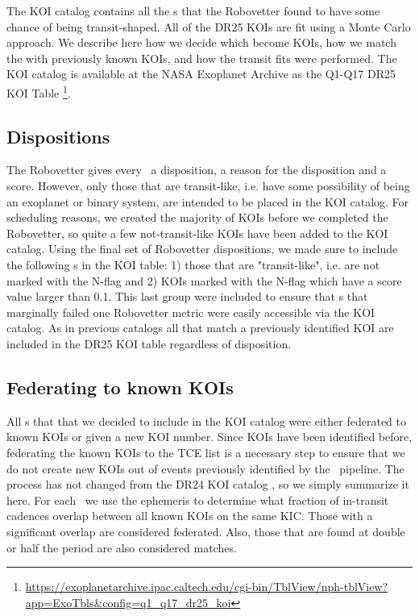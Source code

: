 The KOI catalog contains all the \opstce s that the Robovetter found to have some chance of being transit-shaped. All of the DR25 KOIs are fit using a Monte Carlo approach. We describe here how we decide which  become KOIs, how we match the  with previously known KOIs, and how the transit fits were performed. The KOI catalog is available at the NASA Exoplanet Archive as the Q1-Q17 DR25 KOI Table \footnote{\url{https://exoplanetarchive.ipac.caltech.edu/cgi-bin/TblView/nph-tblView?app=ExoTbls\&config=q1\_q17\_dr25\_koi}}.
\label{koisec}

\subsection{Dispositions}
The Robovetter gives every \opstce\ a disposition, a reason for the disposition and a score.  However, only those that are transit-like, i.e. have some possibility of being an exoplanet or binary system, are intended to be placed in the KOI catalog. For scheduling reasons, we created the majority of KOIs before we completed the Robovetter, so quite a few not-transit-like KOIs have been added to the KOI catalog. Using the final set of Robovetter dispositions, we made sure to include the following \opstce s in the KOI table: 1) those that are "transit-like", i.e. are not marked with the N-flag and 2) KOIs marked with the N-flag which have a score value larger than 0.1.  This last group were included to ensure that \opstce s that marginally failed one Robovetter metric were easily accessible via the KOI catalog. As in previous catalogs all  that match a previously identified KOI are included in the DR25 KOI table regardless of disposition.


\subsection{Federating to known KOIs}
\label{s:federation}
All \opstce s that that we decided to include in the KOI catalog were either federated to known KOIs or given a new KOI number. Since KOIs have been identified before, federating the known KOIs to the TCE list is a necessary step to ensure that we do not create new KOIs out of events previously identified by the \Kepler\ pipeline.  The process has not changed from the  DR24 KOI catalog \citep{Coughlin2016}, so we simply summarize it here.  For each \opstce\ we use the ephemeris to determine what fraction of in-transit cadences overlap between all known KOIs on the same KIC.  Those with a significant overlap are considered federated.  Also, those that are found at double or half the period are also considered matches.  

